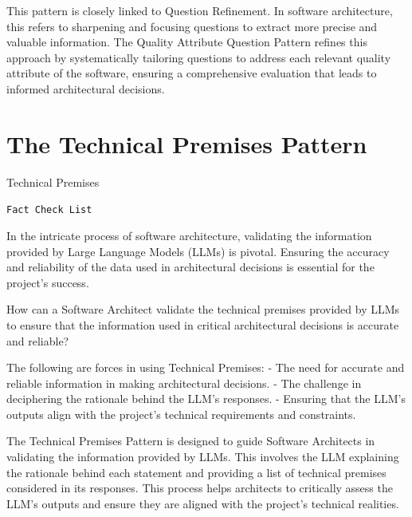  This pattern is closely linked to Question Refinement. In software architecture, this refers to sharpening and focusing questions to extract more precise and valuable information. The Quality Attribute Question Pattern refines this approach by systematically tailoring questions to address each relevant quality attribute of the software, ensuring a comprehensive evaluation that leads to informed architectural decisions.




\section{The Technical Premises Pattern} \label{sec:technical-premises}

 Technical Premises

\texttt{Fact Check List}

 In the intricate process of software architecture, validating the information provided by Large Language Models (LLMs) is pivotal. Ensuring the accuracy and reliability of the data used in architectural decisions is essential for the project's success.

 How can a Software Architect validate the technical premises provided by LLMs to ensure that the information used in critical architectural decisions is accurate and reliable?

 The following are forces in using Technical Premises:
\newline
- The need for accurate and reliable information in making architectural decisions.
\newline
- The challenge in deciphering the rationale behind the LLM's responses.
\newline
- Ensuring that the LLM’s outputs align with the project's technical requirements and constraints.
    
 The Technical Premises Pattern is designed to guide Software Architects in validating the information provided by LLMs. This involves the LLM explaining the rationale behind each statement and providing a list of technical premises considered in its responses. This process helps architects to critically assess the LLM's outputs and ensure they are aligned with the project's technical realities.





